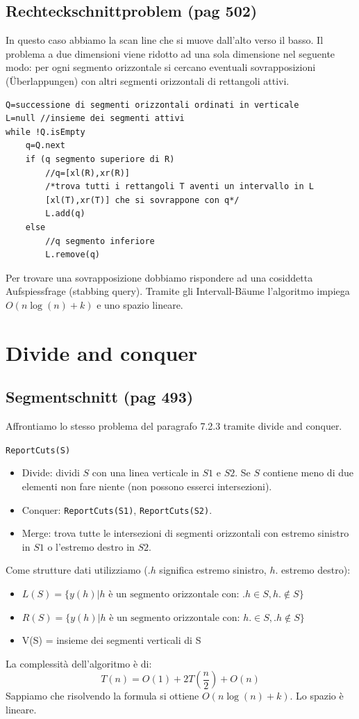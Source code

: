 \documentclass[a4paper]{book}
\newcommand{\inline}[1]{\lstinline!#1!}%
\newcommand{\lstIndent}{4}
\begin{document}
\subsection{Rechteckschnittproblem (pag 502)}
In questo caso abbiamo la scan line che si muove dall'alto verso il basso. Il problema a due dimensioni viene ridotto ad una sola dimensione nel seguente modo: per ogni segmento orizzontale si cercano eventuali sovrapposizioni (Überlappungen) con altri segmenti orizzontali di rettangoli attivi.
\begin{lstlisting}[tabsize=\lstIndent]
Q=successione di segmenti orizzontali ordinati in verticale
L=null //insieme dei segmenti attivi
while !Q.isEmpty
	q=Q.next
	if (q segmento superiore di R)
		//q=[xl(R),xr(R)]
		/*trova tutti i rettangoli T aventi un intervallo in L
		[xl(T),xr(T)] che si sovrappone con q*/
		L.add(q)
	else
		//q segmento inferiore
		L.remove(q)			
\end{lstlisting}
Per trovare una sovrapposizione dobbiamo rispondere ad una cosiddetta Aufspiessfrage (stabbing query). Tramite gli Intervall-Bäume l'algoritmo impiega $O(n \log(n)+k)$ e uno spazio lineare.

\section{Divide and conquer}
\subsection{Segmentschnitt (pag 493)}
Affrontiamo lo stesso problema del paragrafo 7.2.3 tramite divide and conquer.

\inline{ReportCuts(S)}
\begin{itemize}
\item Divide: dividi $S$ con una linea verticale in $S1$ e $S2$. Se $S$ contiene meno di due elementi non fare niente (non possono esserci intersezioni).
\item Conquer: \inline{ReportCuts(S1)}, \inline{ReportCuts(S2)}.
\item Merge: trova tutte le intersezioni di segmenti orizzontali con estremo sinistro in $S1$ o l'estremo destro in $S2$.
\end{itemize}
Come strutture dati utilizziamo ($.h$ significa estremo sinistro, $h.$ estremo destro):
\begin{itemize}
\item $L(S) = \{y(h)|\mbox{$h$ è un segmento orizzontale con: } .h\in S, h.\not  \in S\}$
\item $R(S) = \{y(h)|\mbox{$h$ è un segmento orizzontale con: } h.\in S, .h\not  \in S\}$
\item V(S) = insieme dei segmenti verticali di S
\end{itemize}
La complessità dell'algoritmo è di:
$$T(n)=O(1)+2T\left(\frac{n}{2}\right)+O(n)$$
Sappiamo che risolvendo la formula si ottiene $O(n \log(n)+k)$. Lo spazio è lineare.
\end{document}
